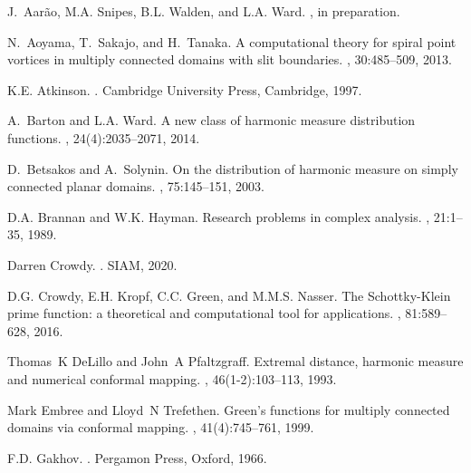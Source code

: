\documentclass[11pt]{article}
\begin{document}




\begin{thebibliography}{10}
	
	J.~Aar{\~a}o, M.A. Snipes, B.L. Walden, and L.A. Ward.
	, in preparation.
	
	N.~Aoyama, T.~Sakajo, and H.~Tanaka.
	\newblock A computational theory for spiral point vortices in multiply
	connected domains with slit boundaries.
	, 30:485--509, 2013.
	
	K.E. Atkinson.
	.
	\newblock Cambridge University Press, Cambridge, 1997.
	
	A.~Barton and L.A. Ward.
	\newblock A new class of harmonic measure distribution functions.
	, 24(4):2035--2071, 2014.
	
	D.~Betsakos and A.~Solynin.
	\newblock On the distribution of harmonic measure on simply connected planar
	domains.
	, 75:145--151, 2003.
	
	D.A. Brannan and W.K. Hayman.
	\newblock Research problems in complex analysis.
	, 21:1--35, 1989.
	
	Darren Crowdy.
	.
	\newblock SIAM, 2020.
	
	D.G. Crowdy, E.H. Kropf, C.C. Green, and M.M.S. Nasser.
	\newblock The {S}chottky-{K}lein prime function: a theoretical and
	computational tool for applications.
	, 81:589--628, 2016.
	
	Thomas~K DeLillo and John~A Pfaltzgraff.
	\newblock Extremal distance, harmonic measure and numerical conformal mapping.
	, 46(1-2):103--113, 1993.
	
	Mark Embree and Lloyd~N Trefethen.
	\newblock Green's functions for multiply connected domains via conformal
	mapping.
	, 41(4):745--761, 1999.
	
	F.D. Gakhov.
	.
	\newblock Pergamon Press, Oxford, 1966.
	

\end{thebibliography}
\end{document}
